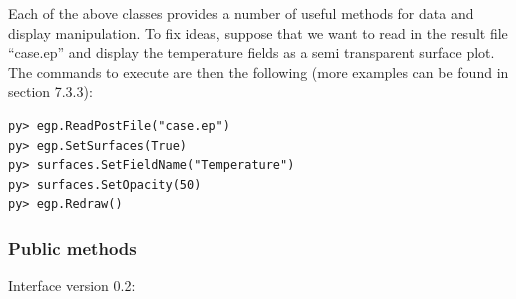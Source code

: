\documentclass[a4paper,12pt]{article}
\begin{document}
Each of the above classes provides a number of useful methods for data and display
manipulation. To fix ideas, suppose that we want to read in the result file ``case.ep''
and display the temperature fields as a semi transparent surface plot. The commands
to execute are then the following (more examples can be found in section 7.3.3):
\begin{footnotesize}
\begin{verbatim}
py> egp.ReadPostFile("case.ep")
py> egp.SetSurfaces(True)
py> surfaces.SetFieldName("Temperature")
py> surfaces.SetOpacity(50)
py> egp.Redraw()
\end{verbatim}
\end{footnotesize}

\subsubsection{Public methods}
Interface version 0.2:
\end{document}
